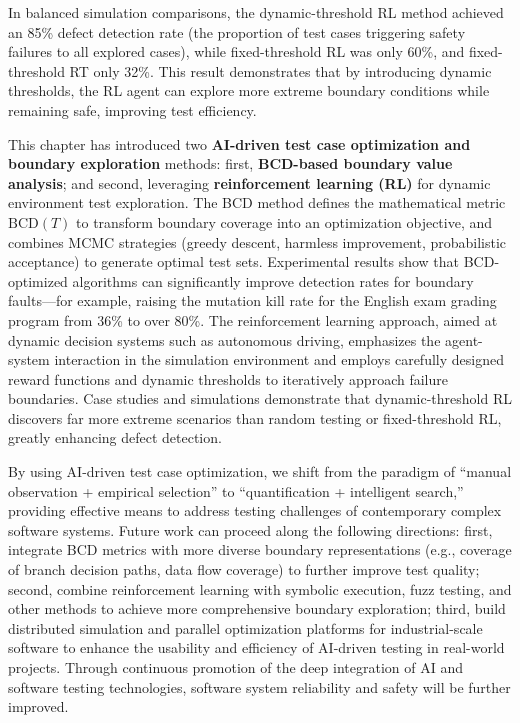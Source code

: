 \documentclass[manuscript,screen,review]{acmart}
\begin{document}
In balanced simulation comparisons, the dynamic-threshold RL method achieved an 85\% defect detection rate (the proportion of test cases triggering safety failures to all explored cases), while fixed-threshold RL was only 60\%, and fixed-threshold RT only 32\%. This result demonstrates that by introducing dynamic thresholds, the RL agent can explore more extreme boundary conditions while remaining safe, improving test efficiency.

This chapter has introduced two \textbf{AI-driven test case optimization and boundary exploration} methods: first, \textbf{BCD-based boundary value analysis}; and second, leveraging \textbf{reinforcement learning (RL)} for dynamic environment test exploration. The BCD method defines the mathematical metric $\mathrm{BCD}(T)$ to transform boundary coverage into an optimization objective, and combines MCMC strategies (greedy descent, harmless improvement, probabilistic acceptance) to generate optimal test sets. Experimental results show that BCD-optimized algorithms can significantly improve detection rates for boundary faults---for example, raising the mutation kill rate for the English exam grading program from 36\% to over 80\%. The reinforcement learning approach, aimed at dynamic decision systems such as autonomous driving, emphasizes the agent-system interaction in the simulation environment and employs carefully designed reward functions and dynamic thresholds to iteratively approach failure boundaries. Case studies and simulations demonstrate that dynamic-threshold RL discovers far more extreme scenarios than random testing or fixed-threshold RL, greatly enhancing defect detection.

By using AI-driven test case optimization, we shift from the paradigm of ``manual observation + empirical selection'' to ``quantification + intelligent search,'' providing effective means to address testing challenges of contemporary complex software systems. Future work can proceed along the following directions: first, integrate BCD metrics with more diverse boundary representations (e.g., coverage of branch decision paths, data flow coverage) to further improve test quality; second, combine reinforcement learning with symbolic execution, fuzz testing, and other methods to achieve more comprehensive boundary exploration; third, build distributed simulation and parallel optimization platforms for industrial-scale software to enhance the usability and efficiency of AI-driven testing in real-world projects. Through continuous promotion of the deep integration of AI and software testing technologies, software system reliability and safety will be further improved.
\end{document}
